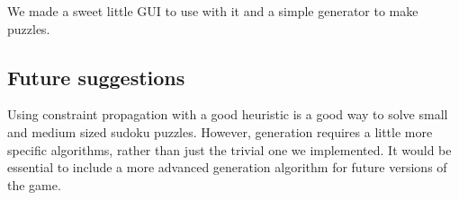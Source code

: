 \documentclass[12pt,a4paper]{article}
\begin{document}
We made a sweet little GUI to use with it and a simple generator to make
puzzles.

\subsection*{Future suggestions}

Using constraint propagation with a good heuristic is a good way to solve small
and medium sized sudoku puzzles. However, generation requires a little more
specific algorithms, rather than just the trivial one we implemented. It would
be essential to include a more advanced generation algorithm for future versions
of the game.
\end{document}
